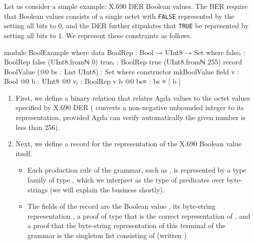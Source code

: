 \documentclass[11pt]{article}
\begin{document}
Let us consider a simple example: X.690 DER Boolean values.
The BER require that Boolean values consists of a single octet
with \texttt{FALSE} represented by the setting all bits to 0, and the DER further
stipulates that \texttt{TRUE} be represented by setting all bits to 1.
We represent these constraints as follows.

\begin{code}
module BoolExample where
  data BoolRep : Bool → UInt8 → Set where
    falseᵣ : BoolRep false (UInt8.fromℕ 0)
    trueᵣ  : BoolRep true (UInt8.fromℕ 255)
  record BoolValue (@0 bs : List UInt8) : Set where
    constructor mkBoolValue
    field
      v     : Bool
      @0 b  : UInt8
      @0 vᵣ : BoolRep v b
      @0 bs≡ : bs ≡ [ b ]
\end{code}

\begin{enumerate}
\item First, we define a binary relation  that relates Agda
 values to the octet values specified by X.690 DER
( converts a non-negative unbounded integer to its
 representation, provided Agda can verify automatically
the given number is less than 256).

\item Next, we define a record  for the representation of
the X.690 Boolean value itself.

\begin{itemize}
\item Each production rule of the grammar, such as , is
represented by a type family of type
\AgdaSpace{}\AgdaSpace{}\AgdaSpace{}\AgdaSpace{},
which we interpret as the type of predicates over byte-strings (we will
explain the  business shortly).

\item The fields of the record are the Boolean value , its
byte-string representation , a proof of type
\AgdaSpace{}\AgdaSpace{}
that  is the correct representation of , and a
proof that the byte-string representation of this terminal of the grammar
is the singleton list consisting of  (written \AgdaFunction{[}\AgdaSpace{}\AgdaSpace{}\AgdaFunction{]})
\end{itemize}
\end{enumerate}
\end{document}
